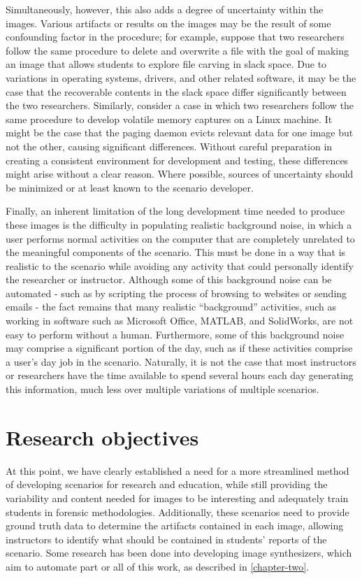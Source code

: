 \documentclass[letterpaper,12pt]{report}
\begin{document}
Simultaneously, however, this also adds a degree of uncertainty within
the images. Various artifacts or results on the images may be the result
of some confounding factor in the procedure; for example, suppose that
two researchers follow the same procedure to delete and overwrite a file
with the goal of making an image that allows students to explore file
carving in slack space. Due to variations in operating systems, drivers,
and other related software, it may be the case that the recoverable
contents in the slack space differ significantly between the two
researchers. Similarly, consider a case in which two researchers follow
the same procedure to develop volatile memory captures on a Linux
machine. It might be the case that the paging daemon evicts relevant
data for one image but not the other, causing significant differences.
Without careful preparation in creating a consistent environment for
development and testing, these differences might arise without a clear
reason. Where possible, sources of uncertainty should be minimized or at
least known to the scenario developer.

Finally, an inherent limitation of the long development time needed to
produce these images is the difficulty in populating realistic
background noise, in which a user performs normal activities on the
computer that are completely unrelated to the meaningful components of
the scenario. This must be done in a way that is realistic to the
scenario while avoiding any activity that could personally identify the
researcher or instructor. Although some of this background noise can be
automated - such as by scripting the process of browsing to websites or
sending emails - the fact remains that many realistic ``background''
activities, such as working in software such as Microsoft Office,
MATLAB, and SolidWorks, are not easy to perform without a human.
Furthermore, some of this background noise may comprise a significant
portion of the day, such as if these activities comprise a user's day
job in the scenario. Naturally, it is not the case that most instructors
or researchers have the time available to spend several hours each day
generating this information, much less over multiple variations of
multiple scenarios.

\section{Research objectives}\label{research-objectives}

At this point, we have clearly established a need for a more streamlined
method of developing scenarios for research and education, while still
providing the variability and content needed for images to be
interesting and adequately train students in forensic methodologies.
Additionally, these scenarios need to provide ground truth data to
determine the artifacts contained in each image, allowing instructors to
identify what should be contained in students' reports of the scenario.
Some research has been done into developing image synthesizers, which
aim to automate part or all of this work, as described in \autoref{chapter-two}.
\end{document}
